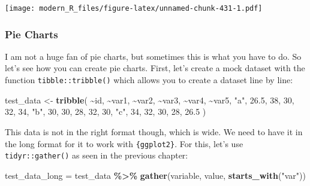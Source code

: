 \documentclass[
]{article}
\newenvironment{Shaded}{\begin{snugshade}}{\end{snugshade}}
\newcommand{\DecValTok}[1]{\textcolor[rgb]{0.00,0.00,0.81}{#1}}
\newcommand{\FloatTok}[1]{\textcolor[rgb]{0.00,0.00,0.81}{#1}}
\newcommand{\KeywordTok}[1]{\textcolor[rgb]{0.13,0.29,0.53}{\textbf{#1}}}
\newcommand{\NormalTok}[1]{#1}
\newcommand{\OperatorTok}[1]{\textcolor[rgb]{0.81,0.36,0.00}{\textbf{#1}}}
\newcommand{\StringTok}[1]{\textcolor[rgb]{0.31,0.60,0.02}{#1}}
\begin{document}
\texttt{[image: modern\_R\_files/figure-latex/unnamed-chunk-431-1.pdf]}

\hypertarget{pie-charts}{%
\subsubsection{Pie Charts}\label{pie-charts}}

I am not a huge fan of pie charts, but sometimes this is what you have to do. So let's see how you
can create pie charts.
First, let's create a mock dataset with the function \texttt{tibble::tribble()} which allows you to create a
dataset line by line:

\begin{Shaded}
\begin{Highlighting}[]
\NormalTok{test\_data \textless{}{-}}\StringTok{ }\KeywordTok{tribble}\NormalTok{(}
  \OperatorTok{\textasciitilde{}}\NormalTok{id, }\OperatorTok{\textasciitilde{}}\NormalTok{var1, }\OperatorTok{\textasciitilde{}}\NormalTok{var2,  }\OperatorTok{\textasciitilde{}}\NormalTok{var3, }\OperatorTok{\textasciitilde{}}\NormalTok{var4, }\OperatorTok{\textasciitilde{}}\NormalTok{var5,}
  \StringTok{"a"}\NormalTok{, }\FloatTok{26.5}\NormalTok{, }\DecValTok{38}\NormalTok{, }\DecValTok{30}\NormalTok{, }\DecValTok{32}\NormalTok{, }\DecValTok{34}\NormalTok{,}
  \StringTok{"b"}\NormalTok{, }\DecValTok{30}\NormalTok{, }\DecValTok{30}\NormalTok{, }\DecValTok{28}\NormalTok{, }\DecValTok{32}\NormalTok{, }\DecValTok{30}\NormalTok{,}
  \StringTok{"c"}\NormalTok{, }\DecValTok{34}\NormalTok{, }\DecValTok{32}\NormalTok{, }\DecValTok{30}\NormalTok{, }\DecValTok{28}\NormalTok{, }\FloatTok{26.5}
\NormalTok{)}
\end{Highlighting}
\end{Shaded}

This data is not in the right format though, which is wide. We need to have it in the long format
for it to work with \texttt{\{ggplot2\}}. For this, let's use \texttt{tidyr::gather()} as seen in the previous chapter:

\begin{Shaded}
\begin{Highlighting}[]
\NormalTok{test\_data\_long =}\StringTok{ }\NormalTok{test\_data }\OperatorTok{\%\textgreater{}\%}
\StringTok{  }\KeywordTok{gather}\NormalTok{(variable, value, }\KeywordTok{starts\_with}\NormalTok{(}\StringTok{"var"}\NormalTok{))}
\end{Highlighting}
\end{Shaded}
\end{document}
